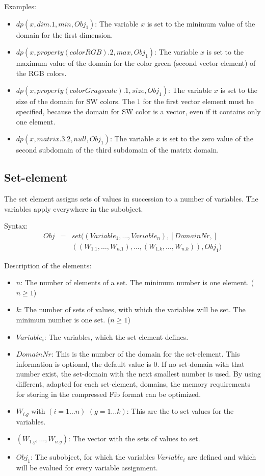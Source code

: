 \bigskip\noindent
Examples:
\begin{itemize}
 \item $dp( x , dim.1, min, Obj_1 )$: The variable $x$ is set to the minimum value of the domain for the first dimension.
 \item $dp( x , property( colorRGB).2, max, Obj_1 )$: The variable $x$ is set to the maximum value of the domain for the color green (second vector element) of the RGB colors.
 \item $dp( x , property( colorGrayscale ).1, size, Obj_1 )$: The variable $x$ is set to the size of the domain for SW colors. The $1$ for the first vector element must be specified, because the domain for SW color is a vector, even if it contains only one element.
 \item $dp( x , matrix.3.2, null, Obj_1 )$: The variable $x$ is set to the zero value of the second subdomain of the third subdomain of the matrix domain.
\end{itemize}



\subsection{Set-element}
\label{secFibSetElement}

\bigskip\noindent
The set element assigns sets of values in succession to a number of variables. The variables apply everywhere in the subobject.

\bigskip\noindent
Syntax:
\begin{eqnarray*}
Obj &=& set( (Variable_1, \ldots, Variable_n), [DomainNr,]\\
&& ( (W_{1.1}, \ldots, W_{n.1}), \ldots,(W_{1.k}, \ldots, W_{n.k}) ), Obj_1)
\end{eqnarray*}

\bigskip\noindent
Description of the elements:
\begin{itemize}
 \item $n$: The number of elements of a set. The minimum number is one element. ($n \geq 1$)
 \item $k$: The number of sets of values, with which the variables will be set. The minimum number is one set. ($n \geq 1$)
 \item $Variable_i$:  The variables, which the set element defines.
 \item $DomainNr$: This is the number of the domain for the set-element. This information is optional, the default value is 0. If no set-domain with that number exist, the set-domain with the next smallest number is used. By using different, adapted for each set-element, domains, the memory requirements for storing in the compressed Fib format can be optimized.
 \item $W_{i.g}$ with $(i = 1 \ldots n)$ $(g = 1 \ldots k)$: This are the to set values for the variables.
 \item $(W_{1.g}, \ldots, W_{n.g})$: The vector with the sets of values to set.
 \item $Obj_1$: The subobject, for which the variables $Variable_i$ are defined and which will be evalued for every variable assignment.
\end{itemize}

